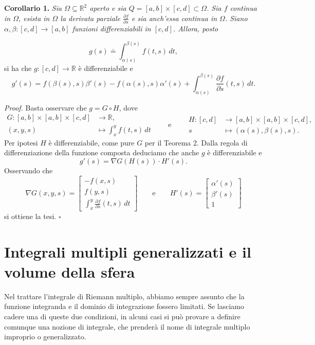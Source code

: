 \documentclass[11pt,a4paper]{article}
\newcommand{\R}{\mathbb{R}}
\newcommand{\result}[2]{\par\medskip\noindent\textbf{#1} \textit{#2}\par}
\newcommand{\proofen}{\par\medskip\noindent\textit{Proof.} }
\newcommand{\qedherecustom}{\hfill$\square$}
\begin{document}
\result{Corollario 1.}{Sia $\Omega\subseteq\R^2$ aperto e sia $Q=[a,b]\times[c,d]\subset\Omega$. Sia $f$ continua in $\Omega$, esista in $\Omega$ la derivata parziale $\frac{\partial f}{\partial s}$ e sia anch'essa continua in $\Omega$. Siano $\alpha,\beta:[c,d]\to[a,b]$ funzioni differenziabili in $[c,d]$. Allora, posto}
\[
g(s)\doteq\int_{\alpha(s)}^{\beta(s)}f(t,s)\,dt,
\]
si ha che $g:[c,d]\to\R$ è differenziabile e
\[
g'(s)=f(\beta(s),s)\beta'(s)-f(\alpha(s),s)\alpha'(s)
+\int_{\alpha(s)}^{\beta(s)}\frac{\partial f}{\partial s}(t,s)\,dt.
\]

\proofen Basta osservare che $g=G\circ H$, dove
\[
\begin{aligned}
    G:[a,b]\times[a,b]\times[c,d]&\longrightarrow\R,\\
    (x,y,s)&\longmapsto\int_x^y f(t,s)\,dt
\end{aligned}
\qquad\text{e}\qquad
\begin{aligned}
    H:[c,d]&\longrightarrow[a,b]\times[a,b]\times[c,d],\\
    s&\longmapsto(\alpha(s),\beta(s),s).
\end{aligned}
\]
Per ipotesi $H$ è differenziabile, come pure $G$ per il Teorema 2. Dalla regola di differenziazione della funzione composta deduciamo che anche $g$ è differenziabile e
\[
g'(s)=\nabla G(H(s))\cdot H'(s).
\]
Osservando che
\[
\nabla G(x,y,s)=
\begin{bmatrix}
    -f(x,s)\\
    f(y,s)\\
    \displaystyle\int_x^y\frac{\partial f}{\partial s}(t,s)\,dt
\end{bmatrix}
\qquad\text{e}\qquad
H'(s)=
\begin{bmatrix}
    \alpha'(s)\\
    \beta'(s)\\
    1
\end{bmatrix}
\]
si ottiene la tesi. \qedherecustom

\section{Integrali multipli generalizzati e il volume della sfera}

Nel trattare l'integrale di Riemann multiplo, abbiamo sempre assunto che la funzione integranda e il dominio di integrazione fossero limitati. Se lasciamo cadere una di queste due condizioni, in alcuni casi si può provare a definire comunque una nozione di integrale, che prenderà il nome di integrale multiplo improprio o generalizzato.
\end{document}
